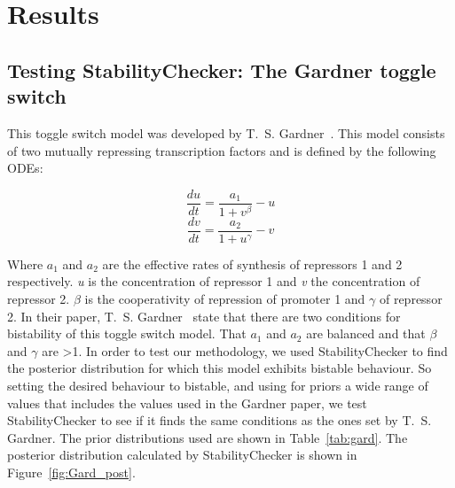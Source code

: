 \section{Results}
\subsection{Testing StabilityChecker: The Gardner toggle switch}

This toggle switch model was developed by T.~S. Gardner~\autocite{Gardner:2000vha}. This model consists of two mutually repressing transcription factors and is defined by the following ODEs:

\begin{equation}\frac{du}{dt} = \frac{a_1}{1+v^{\beta}} - u \label{eq:gard_1}\end{equation}
\begin{equation}\frac{dv}{dt} = \frac{a_2}{1+u^{\gamma }} - v\label{eq:gard_2}\end{equation}

Where $a_1$ and $a_2$ are the effective rates of synthesis of repressors 1 and 2 respectively. \textit{u} is the concentration of repressor 1 and \textit{v} the concentration of repressor 2. \textit{$\beta$} is the cooperativity of repression of promoter 1 and \textit{$\gamma$} of repressor 2. In their paper,  T.~S. Gardner~\autocite{Gardner:2000vha} state that there are two conditions for bistability of this toggle switch model. That $a_1$ and $a_2$ are balanced and that $\beta$ and $\gamma$ are \textgreater 1. In order to test our methodology, we used StabilityChecker to find the posterior distribution for which this model exhibits bistable behaviour. So setting the desired behaviour to bistable, and using for priors a wide range of values that includes the values used in the Gardner paper, we test StabilityChecker to see if it finds the same conditions as the ones set by T.~S. Gardner. The prior distributions used are shown in Table~\ref{tab:gard}. The posterior distribution calculated by StabilityChecker is shown in Figure~\ref{fig:Gard_post}.


